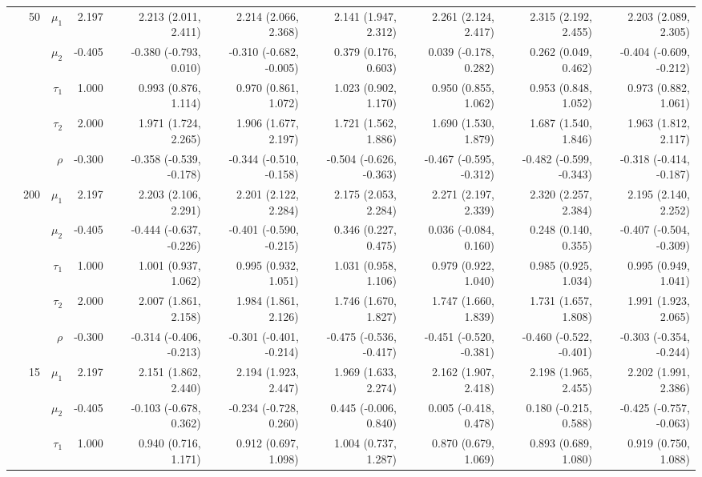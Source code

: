 \documentclass[
]{article}
\begin{document}
\begin{table}
\begin{tabular}[t]{rrrrrrrrrr}
\addlinespace
 & 50 & $\mu_1$ & 2.197 & 2.213 (2.011, 2.411) & 2.214 (2.066, 2.368) & 2.141 (1.947, 2.312) & 2.261 (2.124, 2.417) & 2.315 (2.192, 2.455) & 2.203 (2.089, 2.305)\\
 &  & $\mu_2$ & -0.405 & -0.380 (-0.793, 0.010) & -0.310 (-0.682, -0.005) & 0.379 (0.176, 0.603) & 0.039 (-0.178, 0.282) & 0.262 (0.049, 0.462) & -0.404 (-0.609, -0.212)\\
 &  & $\tau_1$ & 1.000 & 0.993 (0.876, 1.114) & 0.970 (0.861, 1.072) & 1.023 (0.902, 1.170) & 0.950 (0.855, 1.062) & 0.953 (0.848, 1.052) & 0.973 (0.882, 1.061)\\
 &  & $\tau_2$ & 2.000 & 1.971 (1.724, 2.265) & 1.906 (1.677, 2.197) & 1.721 (1.562, 1.886) & 1.690 (1.530, 1.879) & 1.687 (1.540, 1.846) & 1.963 (1.812, 2.117)\\
 &  & $\rho$ & -0.300 & -0.358 (-0.539, -0.178) & -0.344 (-0.510, -0.158) & -0.504 (-0.626, -0.363) & -0.467 (-0.595, -0.312) & -0.482 (-0.599, -0.343) & -0.318 (-0.414, -0.187)\\
\addlinespace
 & 200 & $\mu_1$ & 2.197 & 2.203 (2.106, 2.291) & 2.201 (2.122, 2.284) & 2.175 (2.053, 2.284) & 2.271 (2.197, 2.339) & 2.320 (2.257, 2.384) & 2.195 (2.140, 2.252)\\
 &  & $\mu_2$ & -0.405 & -0.444 (-0.637, -0.226) & -0.401 (-0.590, -0.215) & 0.346 (0.227, 0.475) & 0.036 (-0.084, 0.160) & 0.248 (0.140, 0.355) & -0.407 (-0.504, -0.309)\\
 &  & $\tau_1$ & 1.000 & 1.001 (0.937, 1.062) & 0.995 (0.932, 1.051) & 1.031 (0.958, 1.106) & 0.979 (0.922, 1.040) & 0.985 (0.925, 1.034) & 0.995 (0.949, 1.041)\\
 &  & $\tau_2$ & 2.000 & 2.007 (1.861, 2.158) & 1.984 (1.861, 2.126) & 1.746 (1.670, 1.827) & 1.747 (1.660, 1.839) & 1.731 (1.657, 1.808) & 1.991 (1.923, 2.065)\\
 &  & $\rho$ & -0.300 & -0.314 (-0.406, -0.213) & -0.301 (-0.401, -0.214) & -0.475 (-0.536, -0.417) & -0.451 (-0.520, -0.381) & -0.460 (-0.522, -0.401) & -0.303 (-0.354, -0.244)\\
\addlinespace
6 & 15 & $\mu_1$ & 2.197 & 2.151 (1.862, 2.440) & 2.194 (1.923, 2.447) & 1.969 (1.633, 2.274) & 2.162 (1.907, 2.418) & 2.198 (1.965, 2.455) & 2.202 (1.991, 2.386)\\
 &  & $\mu_2$ & -0.405 & -0.103 (-0.678, 0.362) & -0.234 (-0.728, 0.260) & 0.445 (-0.006, 0.840) & 0.005 (-0.418, 0.478) & 0.180 (-0.215, 0.588) & -0.425 (-0.757, -0.063)\\
 &  & $\tau_1$ & 1.000 & 0.940 (0.716, 1.171) & 0.912 (0.697, 1.098) & 1.004 (0.737, 1.287) & 0.870 (0.679, 1.069) & 0.893 (0.689, 1.080) & 0.919 (0.750, 1.088)\\

\end{tabular}
\end{table}
\end{document}

